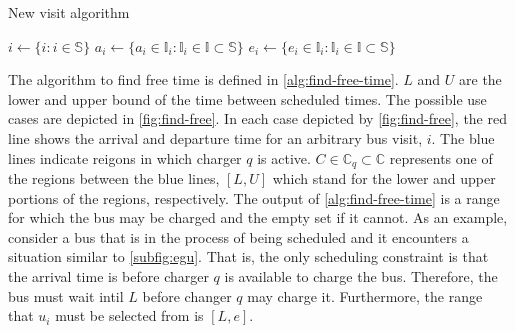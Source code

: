 \documentclass[11pt,a4paper,final]{article}
\newcommand{\I}{\mathbb{I}}                 %
\newcommand{\C}{\mathbb{C}}                 %
\newcommand{\U}{\mathcal{U}}                %
\newcommand{\Sol}{\mathbb{S}}               %
\begin{document}
\begin{algorithm}[H]
\caption{New visit algorithm}
    \LinesNumbered
    \KwIn{($\Sol$)}
    \KwOut{$\I_i'$}


    \Begin
    {
        $i    \leftarrow \{i: i \in \Sol \}$ 
        $a_i  \leftarrow \{ a_i \in \I_i : \I_i \in \I \subset \Sol \}$ 
        $e_i  \leftarrow \{ e_i \in \I_i : \I_i \in \I \subset \Sol \}$ 

        \While {$C_q^j \in \{[a_i, e_i]\} \subset \U_{\C}$}
        {
            {
                \Return{$\I_i' \leftarrow x_i'$} 
            }
        }
    }
\label{alg:new-visit}
\end{algorithm}

The algorithm to find free time is defined in \ref{alg:find-free-time}. \(L\) and \(U\) are the lower and upper bound of the time
between scheduled times. The possible use cases are depicted in \ref{fig:find-free}. In each case depicted by \ref{fig:find-free},
the red line shows the arrival and departure time for an arbitrary bus visit, \(i\). The blue lines indicate reigons in
which charger \(q\) is active. \(C \in \C_q \subset \C\) represents one of the regions between the blue lines, \([L, U]\) which stand
for the lower and upper portions of the regions, respectively. The output of \ref{alg:find-free-time} is a range for which the
bus may be charged and the empty set if it cannot. As an example, consider a bus that is in the process of being
scheduled and it encounters a situation similar to \autoref{subfig:egu}. That is, the only scheduling constraint is that
the arrival time is before charger \(q\) is available to charge the bus. Therefore, the bus must wait intil \(L\) before
changer \(q\) may charge it. Furthermore, the range that \(u_i\) must be selected from is \([L,e]\).
\end{document}
